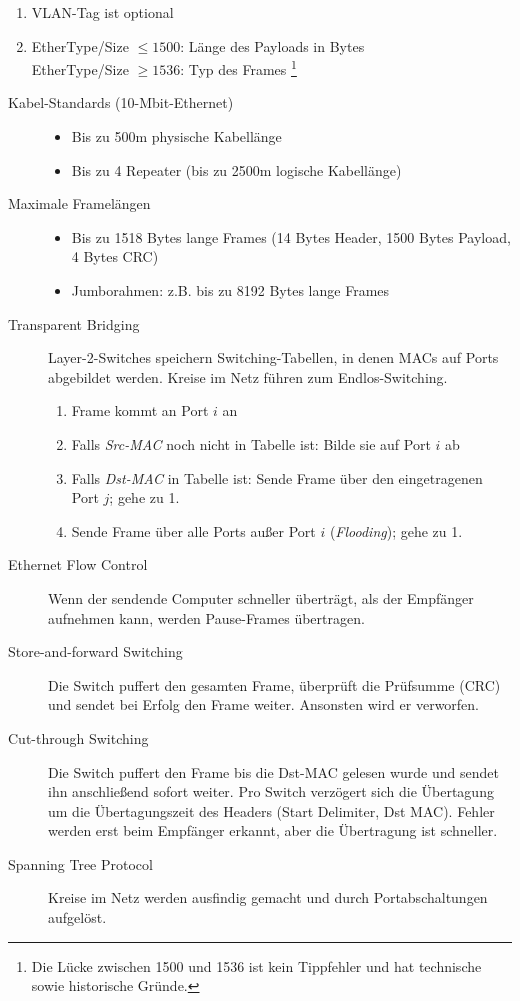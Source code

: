\documentclass[a4paper]{article}
\begin{document}
%
\begin{enumerate}[label=(\roman*)]
    \item VLAN-Tag ist optional
    \item EtherType/Size $\leq 1500$: Länge des Payloads in Bytes \\
        EtherType/Size $\geq 1536$: Typ des Frames \footnote{Die Lücke zwischen 1500 und 1536 ist kein Tippfehler und hat technische sowie historische Gründe.}
\end{enumerate}
\bigskip
%
\begin{description}
    \item[Kabel-Standards (10-Mbit-Ethernet)] \hfill
    \begin{itemize}
        \item Bis zu 500m physische Kabellänge
        \item Bis zu 4 Repeater (bis zu 2500m logische Kabellänge)
    \end{itemize}
    \item[Maximale Framelängen] \hfill
    \begin{itemize}
        \item Bis zu 1518 Bytes lange Frames (14 Bytes Header, 1500 Bytes Payload, 4 Bytes CRC)
        \item Jumborahmen: z.B. bis zu 8192 Bytes lange Frames
    \end{itemize}
    \item[Transparent Bridging] Layer-2-Switches speichern Switching-Tabellen, in denen MACs auf Ports abgebildet werden. Kreise im Netz führen zum Endlos-Switching.
    \begin{enumerate}
        \item Frame kommt an Port $i$ an
        \item Falls \textit{Src-MAC} noch nicht in Tabelle ist: Bilde sie auf Port $i$ ab
        \item Falls \textit{Dst-MAC} in Tabelle ist: Sende Frame über den eingetragenen Port $j$; gehe zu 1.
        \item Sende Frame über alle Ports außer Port $i$ (\textit{Flooding}); gehe zu 1.
    \end{enumerate}
    \item[Ethernet Flow Control] Wenn der sendende Computer schneller überträgt, als der Empfänger aufnehmen kann, werden Pause-Frames übertragen.
    \item[Store-and-forward Switching] Die Switch puffert den gesamten Frame, überprüft die Prüfsumme (CRC) und sendet bei Erfolg den Frame weiter. Ansonsten wird er verworfen.
    \item[Cut-through Switching] Die Switch puffert den Frame bis die Dst-MAC gelesen wurde und sendet ihn anschließend sofort weiter. Pro Switch verzögert sich die Übertagung um die Übertagungszeit des Headers (Start Delimiter, Dst MAC). Fehler werden erst beim Empfänger erkannt, aber die Übertragung ist schneller.
    \item[Spanning Tree Protocol] Kreise im Netz werden ausfindig gemacht und durch Portabschaltungen aufgelöst.
\end{description}
\end{document}
